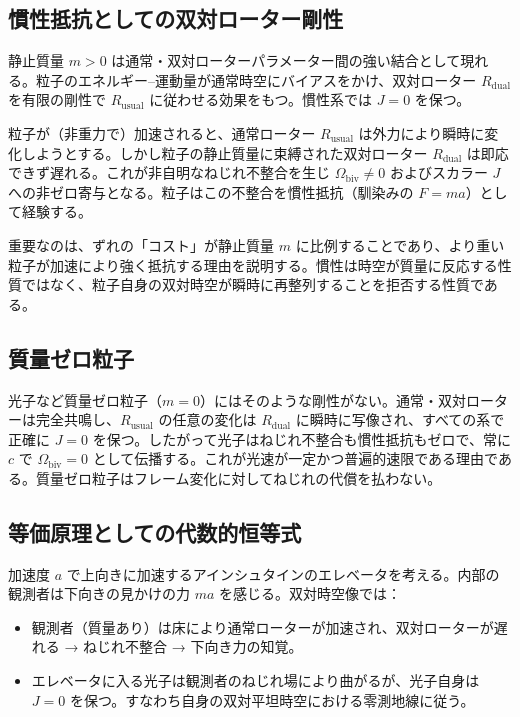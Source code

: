 \documentclass[a4paper]{article}
\begin{document}
\subsection{慣性抵抗としての双対ローター剛性}

静止質量 $m > 0$ は通常・双対ローターパラメーター間の強い結合として現れる。粒子のエネルギー--運動量が通常時空にバイアスをかけ、双対ローター $R_\text{dual}$ を有限の剛性で $R_\text{usual}$ に従わせる効果をもつ。慣性系では $J = 0$ を保つ。

粒子が（非重力で）加速されると、通常ローター $R_\text{usual}$ は外力により瞬時に変化しようとする。しかし粒子の静止質量に束縛された双対ローター $R_\text{dual}$ は即応できず遅れる。これが非自明なねじれ不整合を生じ $\Omega_\text{biv} \neq 0$ およびスカラー $J$ への非ゼロ寄与となる。粒子はこの不整合を慣性抵抗（馴染みの $F = ma$）として経験する。

重要なのは、ずれの「コスト」が静止質量 $m$ に比例することであり、より重い粒子が加速により強く抵抗する理由を説明する。慣性は時空が質量に反応する性質ではなく、粒子自身の双対時空が瞬時に再整列することを拒否する性質である。

\subsection{質量ゼロ粒子}

光子など質量ゼロ粒子（$m = 0$）にはそのような剛性がない。通常・双対ローターは完全共鳴し、$R_\text{usual}$ の任意の変化は $R_\text{dual}$ に瞬時に写像され、すべての系で正確に $J = 0$ を保つ。したがって光子はねじれ不整合も慣性抵抗もゼロで、常に $c$ で $\Omega_\text{biv} = 0$ として伝播する。これが光速が一定かつ普遍的速限である理由である。質量ゼロ粒子はフレーム変化に対してねじれの代償を払わない。

\subsection{等価原理としての代数的恒等式}

加速度 $a$ で上向きに加速するアインシュタインのエレベータを考える。内部の観測者は下向きの見かけの力 $ma$ を感じる。双対時空像では：

\begin{itemize}
\item 観測者（質量あり）は床により通常ローターが加速され、双対ローターが遅れる → ねじれ不整合 → 下向き力の知覚。
\item エレベータに入る光子は観測者のねじれ場により曲がるが、光子自身は $J = 0$ を保つ。すなわち自身の双対平坦時空における零測地線に従う。
\end{itemize}
\end{document}
